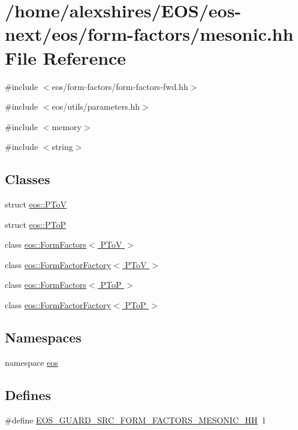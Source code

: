 \hypertarget{mesonic_8hh}{
\section{/home/alexshires/EOS/eos-\/next/eos/form-\/factors/mesonic.hh File Reference}
\label{mesonic_8hh}
}
{\ttfamily \#include $<$eos/form-\/factors/form-\/factors-\/fwd.hh$>$}\par
{\ttfamily \#include $<$eos/utils/parameters.hh$>$}\par
{\ttfamily \#include $<$memory$>$}\par
{\ttfamily \#include $<$string$>$}\par
\subsection*{Classes}
\begin{DoxyCompactItemize}
\item 
struct \hyperlink{structeos_1_1PToV}{eos::PToV}
\item 
struct \hyperlink{structeos_1_1PToP}{eos::PToP}
\item 
class \hyperlink{classeos_1_1FormFactors_3_01PToV_01_4}{eos::FormFactors$<$ PToV $>$}
\item 
class \hyperlink{classeos_1_1FormFactorFactory_3_01PToV_01_4}{eos::FormFactorFactory$<$ PToV $>$}
\item 
class \hyperlink{classeos_1_1FormFactors_3_01PToP_01_4}{eos::FormFactors$<$ PToP $>$}
\item 
class \hyperlink{classeos_1_1FormFactorFactory_3_01PToP_01_4}{eos::FormFactorFactory$<$ PToP $>$}
\end{DoxyCompactItemize}
\subsection*{Namespaces}
\begin{DoxyCompactItemize}
\item 
namespace \hyperlink{namespaceeos}{eos}
\end{DoxyCompactItemize}
\subsection*{Defines}
\begin{DoxyCompactItemize}
\item 
\#define \hyperlink{mesonic_8hh_af14d4cdc53d4012250bcb57e3d8cc2d9}{EOS\_\-GUARD\_\-SRC\_\-FORM\_\-FACTORS\_\-MESONIC\_\-HH}~1
\end{DoxyCompactItemize}


